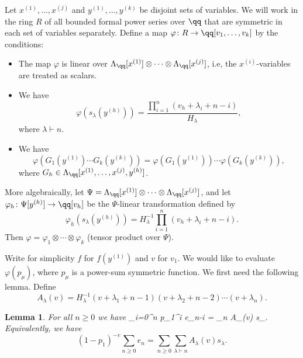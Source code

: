 \documentclass[12pt]{article}
\newtheorem{lemma}[theorem]{Lemma}
\theoremstyle{definition}
\theoremstyle{remark}
\begin{document}
Let $x^{(1)}, \dots,x^{(j)}$ and $y^{(1)}, \dots, y^{(k)}$ be disjoint
sets of variables. We will work in the ring $R$ of all bounded formal
power series over $\qq$ that are symmetric in each set of variables
separately. Define a map $\varphi\colon R\rightarrow
\qq[v_1,\dots,v_k]$ by the conditions:
 \begin{itemize}
  \item The map $\varphi$ is linear over $\Lambda_\qq[x^{(1)}] \otimes
 \cdots\otimes
 \Lambda_\qq[x^{(j)}]$, i.e, the $x^{(i)}$-variables are treated as
  scalars.
  \item We have 
   $$ \varphi\left(s_\lambda(y^{(h)})\right) =
    \frac{\prod_{i=1}^n (v_h+\lambda_i+n-i)}{H_\lambda}, $$
 where $\lambda\vdash n$.
  \item We have
   $$   \varphi\left(G_1(y^{(1)})\cdots G_k(y^{(k)})\right) =
    \varphi\left(G_1(y^{(1)})\right)\cdots 
      \varphi\left(G_k(y^{(k)})\right), $$
where $G_h\in\Lambda_{\qq}[x^{(1)},\dots,x^{(j)}, y^{(h)}]$.
  \end{itemize}    
More algebraically, let $\Psi= \Lambda_\qq[x^{(1)}] \otimes
 \cdots\otimes \Lambda_\qq[x^{(j)}]$, and let $\varphi_h\colon
 \Psi[y^{(h)}]\rightarrow \qq[v_h]$ be the $\Psi$-linear
 transformation defined by 
  $$ \varphi_h(s_\lambda(y^{(h)})) = H_\lambda^{-1}\prod_{i=1}^n
   (v_h+\lambda_i+n-i). $$ 
Then $\varphi = \varphi_1\otimes\cdots
\otimes \varphi_k$ (tensor product over $\Psi$).

Write for simplicity $f$ for $f(y^{(1)})$ and $v$ for $v_1$.
We would like to evaluate $\varphi(p_\mu)$, where $p_\mu$ is a
power-sum symmetric function. We first need the following
lemma. Define
  $$ A_\lambda(v)=H_\lambda^{-1} (v+\lambda_1+n-1)
       (v+\lambda_2+n-2)\cdots(v+\lambda_n). $$

\begin{lemma} \label{lemma:spid}
For all $n\geq 0$ we have
 \beq   \sum_{i=0}^n  p_1^i e_{n-i} =
  \sum_{\lambda\vdash n} A_\lambda(v) s_\lambda. 
    \label{eq:pelem} \eeq
Equivalently, we have
  $$ (1-p_1)^{-v}\sum_{n\geq 0}e_n = \sum_{n\geq 0}
    \sum_{\lambda\vdash n} A_\lambda(v) s_\lambda. $$
\end{lemma}
 
\end{document}
